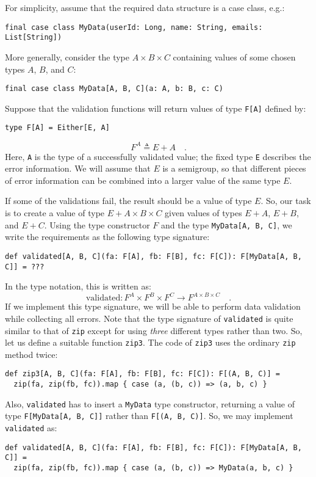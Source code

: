 For simplicity, assume that the required data structure is a case
class, e.g.:
\begin{lstlisting}
final case class MyData(userId: Long, name: String, emails: List[String])
\end{lstlisting}
More generally, consider the type $A\times B\times C$ containing
values of some chosen types $A$, $B$, and $C$:
\begin{lstlisting}
final case class MyData[A, B, C](a: A, b: B, c: C)
\end{lstlisting}
Suppose that the validation functions will return values of type \lstinline!F[A]!
defined by:
\begin{lstlisting}
type F[A] = Either[E, A]
\end{lstlisting}
\[
F^{A}\triangleq E+A\quad.
\]
Here, \lstinline!A! is the type of a successfully validated value;
 the fixed type \lstinline!E! describes the error information. We
will assume that $E$ is a semigroup, so that different pieces of
error information can be combined into a larger value of the same
type $E$.

If some of the validations fail, the result should be a value of type
$E$. So, our task is to create a value of type $E+A\times B\times C$
given values of types $E+A$, $E+B$, and $E+C$. Using the type constructor
$F$ and the type \lstinline!MyData[A, B, C]!, we write the requirements
as the following type signature:
\begin{lstlisting}
def validated[A, B, C](fa: F[A], fb: F[B], fc: F[C]): F[MyData[A, B, C]] = ???
\end{lstlisting}
In the type notation, this is written as:
\[
\text{validated}:F^{A}\times F^{B}\times F^{C}\rightarrow F^{A\times B\times C}\quad.
\]
If we implement this type signature, we will be able to perform data
validation while collecting all errors. Note that the type signature
of \lstinline!validated! is quite similar to that of \lstinline!zip!
except for using \emph{three} different types rather than two. So,
let us define a suitable function \lstinline!zip3!. The code of \lstinline!zip3!
uses the ordinary \lstinline!zip! method twice:
\begin{lstlisting}
def zip3[A, B, C](fa: F[A], fb: F[B], fc: F[C]): F[(A, B, C)] =
  zip(fa, zip(fb, fc)).map { case (a, (b, c)) => (a, b, c) }
\end{lstlisting}
Also, \lstinline!validated! has to insert a \lstinline!MyData! type
constructor, returning a value of type \lstinline!F[MyData[A, B, C]]!
rather than \lstinline!F[(A, B, C)]!. So, we may implement \lstinline!validated!
as:
\begin{lstlisting}
def validated[A, B, C](fa: F[A], fb: F[B], fc: F[C]): F[MyData[A, B, C]] =
  zip(fa, zip(fb, fc)).map { case (a, (b, c)) => MyData(a, b, c) }
\end{lstlisting}

